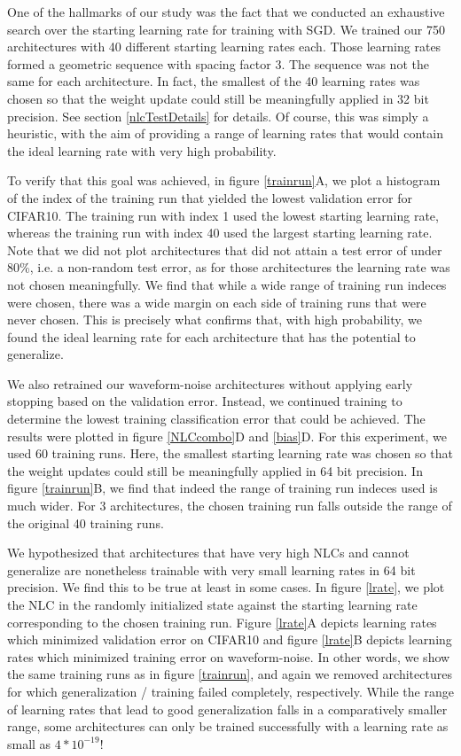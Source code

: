 \documentclass{article} %
\begin{document}
One of the hallmarks of our study was the fact that we conducted an exhaustive search over the starting learning rate for training with SGD. We trained our 750 architectures with 40 different starting learning rates each. Those learning rates formed a geometric sequence with spacing factor 3. The sequence was not the same for each architecture. In fact, the smallest of the 40 learning rates was chosen so that the weight update could still be meaningfully applied in 32 bit precision. See section \ref{nlcTestDetails} for details. Of course, this was simply a heuristic, with the aim of providing a range of learning rates that would contain the ideal learning rate with very high probability. 

To verify that this goal was achieved, in figure \ref{trainrun}A, we plot a histogram of the index of the training run that yielded the lowest validation error for CIFAR10. The training run with index 1 used the lowest starting learning rate, whereas the training run with index 40 used the largest starting learning rate. Note that we did not plot architectures that did not attain a test error of under 80\%, i.e. a non-random test error, as for those architectures the learning rate was not chosen meaningfully. We find that while a wide range of training run indeces were chosen, there was a wide margin on each side of training runs that were never chosen. This is precisely what confirms that, with high probability, we found the ideal learning rate for each architecture that has the potential to generalize.

We also retrained our waveform-noise architectures without applying early stopping based on the validation error. Instead, we continued training to determine the lowest training classification error that could be achieved. The results were plotted in figure \ref{NLCcombo}D and \ref{bias}D. For this experiment, we used 60 training runs. Here, the smallest starting learning rate was chosen so that the weight updates could still be meaningfully applied in 64 bit precision. In figure \ref{trainrun}B, we find that indeed the range of training run indeces used is much wider. For 3 architectures, the chosen training run falls outside the range of the original 40 training runs.

We hypothesized that architectures that have very high NLCs and cannot generalize are nonetheless trainable with very small learning rates in 64 bit precision. We find this to be true at least in some cases. In figure \ref{lrate}, we plot the NLC in the randomly initialized state against the starting learning rate corresponding to the chosen training run. Figure \ref{lrate}A depicts learning rates which minimized validation error on CIFAR10 and figure \ref{lrate}B depicts learning rates which minimized training error on waveform-noise. In other words, we show the same training runs as in figure \ref{trainrun}, and again we removed architectures for which generalization / training failed completely, respectively. While the range of learning rates that lead to good generalization falls in a comparatively smaller range, some architectures can only be trained successfully with a learning rate as small as $4*10^{-19}$! 
\end{document}
